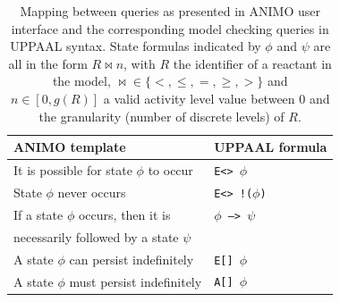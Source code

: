 \documentclass{bmcart}
\begin{document}
\begin{backmatter}
\begin{table}[h!]
\scriptsize
  \begin{center}
    \begin{tabular}{|l|l|}
      \hline
      ANIMO template & UPPAAL formula \\
      \hline
      \hline
      It is possible for state $\phi$ to occur & {\tt E<>\hspace{-1.3mm} $\phi$} \\
      \hline
      State $\phi$ never occurs & {\tt E<>\hspace{-1.3mm} !\hspace{-0.5mm}($\phi$)} \\
      \hline
      If a state $\phi$ occurs, then it is & {\tt $\phi$ --> $\psi$} \\
      necessarily followed by a state $\psi$ & \\
      \hline
      A state $\phi$ can persist indefinitely & {\tt E[]\hspace{-1.3mm} $\phi$} \\
      \hline
      A state $\phi$ must persist indefinitely & {\tt A[]\hspace{-1.3mm} $\phi$} \\
      \hline
    \end{tabular}
  \end{center}
  \caption{Mapping between queries as presented in ANIMO user interface and the corresponding
  model checking queries in UPPAAL syntax. State formulas indicated by $\phi$ and $\psi$ are all in the form
  $R \Join n$, with $R$ the identifier of a reactant in the model, $\Join \in \{<, \leq, =, \geq, >\}$
  and $n \in [0, g(R)]$ a valid activity level value between 0 and the granularity (number of discrete levels) of $R$.
  \label{tab:model-checking-templates}}
\end{table}




\end{backmatter}
\end{document}
